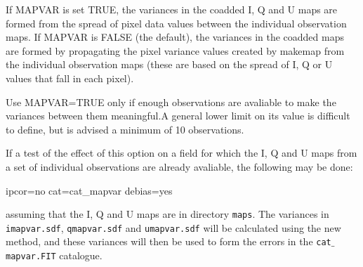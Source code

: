 If MAPVAR is set TRUE, the variances in the coadded I, Q and U maps are
formed from the spread of pixel data values between the individual
observation maps. If MAPVAR is FALSE (the default), the variances in the
coadded maps are formed by propagating the pixel variance values created
by makemap from the individual observation maps (these are based on the
spread of I, Q or U values that fall in each pixel).

Use MAPVAR=TRUE only if enough observations are avaliable to
make the variances between them meaningful.A general lower
limit on its value is difficult to define, but is advised a minimum of 10 observations.


If a test of the effect of this option on a field for which the I, Q and U maps from a set of individual
observations are already avaliable, the following may be done:

\begin{terminalv}
                   ipcor=no cat=cat_mapvar debias=yes
\end{terminalv}

assuming that the I, Q and U maps are in directory \texttt{maps}. The
variances in \texttt{imapvar.sdf}, \texttt{qmapvar.sdf} and
\texttt{umapvar.sdf} will be calculated using the new method, and these
variances will then be used to form the errors in the
\texttt{cat$\_$mapvar.FIT} catalogue.



